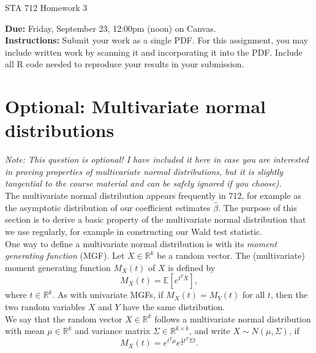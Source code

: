 \documentclass[11pt]{article}
\begin{document}
\begin{center}
\Large
STA 712 Homework 3\\
\normalsize
\vspace{5mm}
\end{center}

\noindent \textbf{Due:} Friday, September 23, 12:00pm (noon) on Canvas.\\ 

\noindent \textbf{Instructions:} Submit your work as a single PDF. For this assignment, you may include written work by scanning it and incorporating it into the PDF. Include all R code needed to reproduce your results in your submission.

\section*{Optional: Multivariate normal distributions}

\textit{Note: This question is optional! I have included it here in case you are interested in proving properties of multivariate normal distributions, but it is slightly tangential to the course material and can be safely ignored if you choose).}\\

\noindent The multivariate normal distribution appears frequently in 712, for example as the asymptotic distribution of our coefficient estimates $\widehat{\beta}$. The purpose of this section is to derive a basic property of the multivariate normal distribution that we use regularly, for example in constructing our Wald test statistic.\\


\noindent One way to define a multivariate normal distribution is with its \textit{moment generating function} (MGF).  Let $X \in \mathbb{R}^k$ be a random vector. The (multivariate) moment generating function $M_X(t)$ of $X$ is defined by
$$M_X(t) = \mathbb{E}[e^{t^T X}],$$
where $t \in \mathbb{R}^k$. As with univariate MGFs, if $M_X(t) = M_Y(t)$ for all $t$, then the two random variables $X$ and $Y$ have the same distribution.\\

\noindent We say that the random vector $X \in \mathbb{R}^k$ follows a multivariate normal distribution with mean $\mu \in \mathbb{R}^k$ and variance matrix $\Sigma \in \mathbb{R}^{k \times k}$, and write $X \sim N(\mu, \Sigma)$, if 
$$M_X(t) = e^{t^T \mu} e^{\frac{1}{2} t^T \Sigma t}.$$
\end{document}
